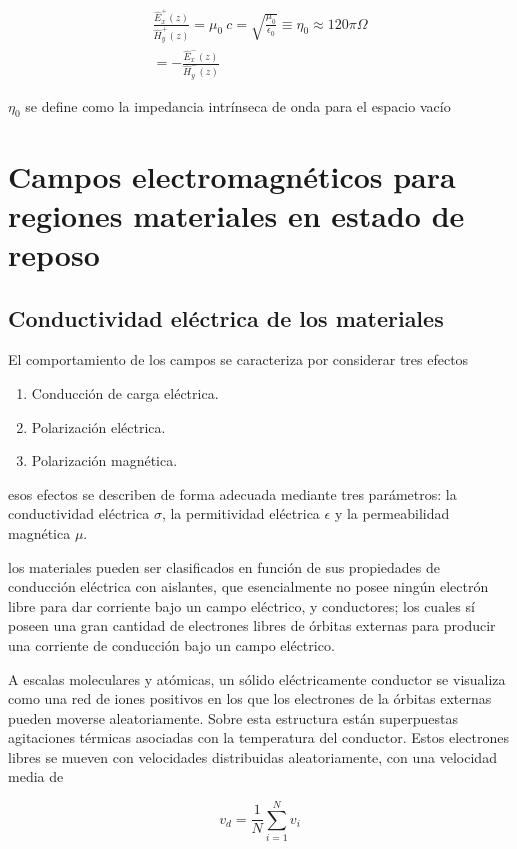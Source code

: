 \begin{eqnarray*}
\frac{\hat{E}_x^+ (z)}{\hat{H}_y^+ (z)} = \mu_0 \ c = \sqrt{\frac{\mu_0}{\epsilon_0}} \equiv \eta_0 \approx 120 \pi \Omega \\
 = - \frac{\hat{E}_x^- (z)}{\hat{H}_y^- (z)}
\end{eqnarray*}

$\eta_0$ se define como la impedancia intrínseca de onda para el espacio vacío 


\section{Campos electromagnéticos para regiones materiales en estado de reposo}

\subsection{Conductividad eléctrica de los materiales}

El comportamiento de los campos se caracteriza por considerar tres efectos

\begin{enumerate}
    \item Conducción de carga eléctrica.
    \item Polarización eléctrica.
    \item Polarización magnética.
\end{enumerate}

esos efectos se describen de forma adecuada mediante tres parámetros: la conductividad eléctrica $\sigma$, la permitividad eléctrica $\epsilon$ y la permeabilidad magnética $\mu$.

los materiales pueden ser clasificados en función de sus propiedades de conducción eléctrica con aislantes, que esencialmente no posee ningún electrón libre para dar corriente bajo un campo eléctrico, y conductores; los cuales sí poseen una gran cantidad de electrones libres de órbitas externas para producir una corriente de conducción bajo un campo eléctrico. 

A escalas moleculares y atómicas, un sólido eléctricamente conductor se visualiza como una red de iones positivos en los que los electrones de la órbitas externas pueden moverse aleatoriamente. Sobre esta estructura están superpuestas agitaciones térmicas asociadas con la temperatura del conductor. Estos electrones libres se mueven con velocidades distribuidas aleatoriamente, con una velocidad media de

\begin{equation*}
v_d = \frac{1}{N} \sum_{i=1}^{N} v_i
\end{equation*}


